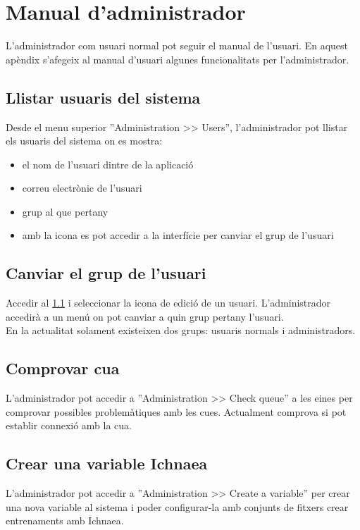 \chapter{Manual d'administrador}
\label{cha:adminguide}

L'administrador com usuari normal pot seguir el manual de l'usuari. En aquest apèndix s'afegeix al manual d'usuari algunes funcionalitats per l'administrador.

\section{Llistar usuaris del sistema}
\label{sec:list_users}
Desde el menu superior ''Administration >> Users'', l'administrador pot llistar els usuaris del sistema on es mostra:
\begin{itemize}
\item el nom de l'usuari dintre de la aplicació
\item correu electrònic de l'usuari
\item grup al que pertany
\item amb la icona \iconedit es pot accedir a la interfície per canviar el grup de l'usuari
\end{itemize}

\section{Canviar el grup de l'usuari}
Accedir al \ref{sec:list_users} i seleccionar la icona de edici\'{o} de un usuari. L'administrador accedir\`{a} a un menú on pot canviar a quin grup pertany l'usuari.\\

En la actualitat solament existeixen dos grups: usuaris normals i administradors.

\section{Comprovar cua}
L'administrador pot accedir a ''Administration >> Check queue'' a les eines per comprovar possibles problem\`{a}tiques amb les cues. Actualment comprova si pot establir connexió amb la cua.

\section{Crear una variable Ichnaea}
L'administrador pot accedir a ''Administration >> Create a variable'' per crear una nova variable al sistema i poder configurar-la amb conjunts de fitxers crear entrenaments amb Ichnaea. 

